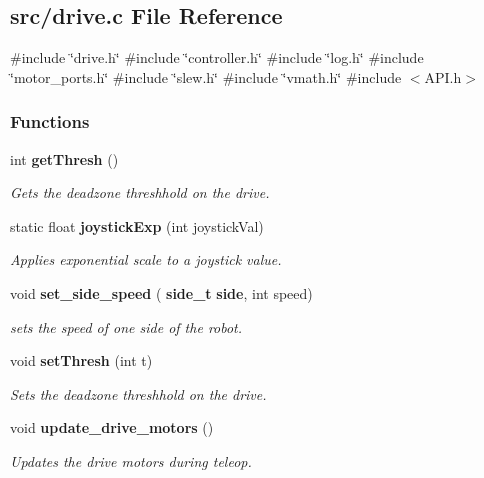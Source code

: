 \subsection{src/drive.c File Reference}
\label{drive_8c}
{\ttfamily \#include \char`\"{}drive.\+h\char`\"{}}\newline
{\ttfamily \#include \char`\"{}controller.\+h\char`\"{}}\newline
{\ttfamily \#include \char`\"{}log.\+h\char`\"{}}\newline
{\ttfamily \#include \char`\"{}motor\+\_\+ports.\+h\char`\"{}}\newline
{\ttfamily \#include \char`\"{}slew.\+h\char`\"{}}\newline
{\ttfamily \#include \char`\"{}vmath.\+h\char`\"{}}\newline
{\ttfamily \#include $<$A\+P\+I.\+h$>$}\newline
\subsubsection*{Functions}
\begin{DoxyCompactItemize}
\item 
int \textbf{ get\+Thresh} ()
\begin{DoxyCompactList}\small\item\em Gets the deadzone threshhold on the drive. \end{DoxyCompactList}\item 
static float \textbf{ joystick\+Exp} (int joystick\+Val)
\begin{DoxyCompactList}\small\item\em Applies exponential scale to a joystick value. \end{DoxyCompactList}\item 
void \textbf{ set\+\_\+side\+\_\+speed} (\textbf{ side\+\_\+t} \textbf{ side}, int speed)
\begin{DoxyCompactList}\small\item\em sets the speed of one side of the robot. \end{DoxyCompactList}\item 
void \textbf{ set\+Thresh} (int t)
\begin{DoxyCompactList}\small\item\em Sets the deadzone threshhold on the drive. \end{DoxyCompactList}\item 
void \textbf{ update\+\_\+drive\+\_\+motors} ()
\begin{DoxyCompactList}\small\item\em Updates the drive motors during teleop. \end{DoxyCompactList}\end{DoxyCompactItemize}
